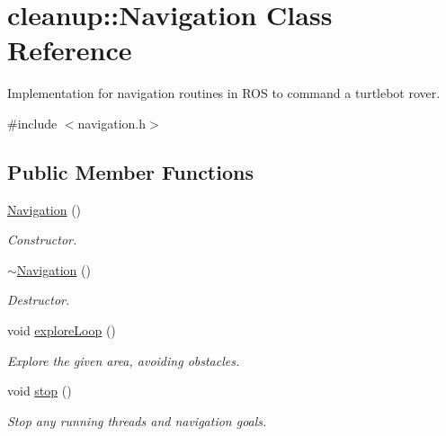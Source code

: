\hypertarget{classcleanup_1_1_navigation}{}\section{cleanup\+:\+:Navigation Class Reference}
\label{classcleanup_1_1_navigation}


Implementation for navigation routines in R\+OS to command a turtlebot rover.  




{\ttfamily \#include $<$navigation.\+h$>$}

\subsection*{Public Member Functions}
\begin{DoxyCompactItemize}
\item 
\mbox{\label{classcleanup_1_1_navigation_ae4f3e6facf6e48e4286cf751a8be6fb1}} 
\hyperlink{classcleanup_1_1_navigation_ae4f3e6facf6e48e4286cf751a8be6fb1}{Navigation} ()
\begin{DoxyCompactList}\small\item\em Constructor. \end{DoxyCompactList}\item 
\mbox{\label{classcleanup_1_1_navigation_ab6e850bcac11ad0a06f371053844cddc}} 
\hyperlink{classcleanup_1_1_navigation_ab6e850bcac11ad0a06f371053844cddc}{$\sim$\+Navigation} ()
\begin{DoxyCompactList}\small\item\em Destructor. \end{DoxyCompactList}\item 
void \hyperlink{classcleanup_1_1_navigation_a4990de9c7d80e4bd64dbb40f7bac596e}{explore\+Loop} ()
\begin{DoxyCompactList}\small\item\em Explore the given area, avoiding obstacles. \end{DoxyCompactList}\item 
\mbox{\label{classcleanup_1_1_navigation_aa95c5e9bef0d4780c828ee5952964f8f}} 
void \hyperlink{classcleanup_1_1_navigation_aa95c5e9bef0d4780c828ee5952964f8f}{stop} ()
\begin{DoxyCompactList}\small\item\em Stop any running threads and navigation goals. \end{DoxyCompactList}\item 

\end{DoxyCompactItemize}
